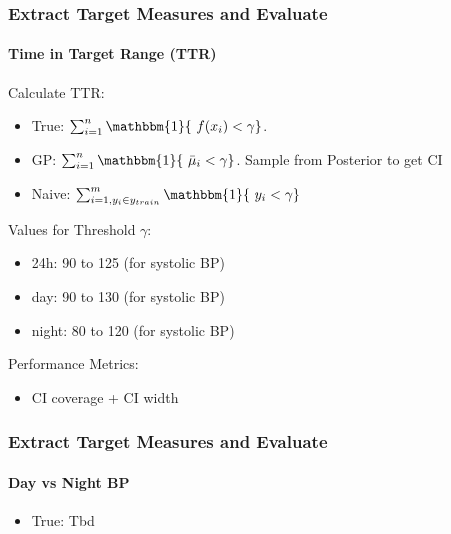 \documentclass[
	8pt, %
]{beamer}
\begin{document}
\begin{frame}
	\frametitle{Extract Target Measures and Evaluate}
	\framesubtitle{Time in Target Range (TTR)} %

	Calculate TTR:
	\begin{itemize}
			\item True: $\sum_{i=1}^{n} \mathbbm{1}\{\ f(x_i) < \gamma \}$.
			\item GP: $\sum_{i=1}^{n} \mathbbm{1}\{\ \bar{\mu}_i < \gamma \}$. Sample from Posterior to get CI
			\item Naive: $\sum_{i=1, y_i \in y_{train}}^{m} \mathbbm{1}\{\ y_i < \gamma \}$
	\end{itemize}


	\bigskip

	Values for Threshold $\gamma$:
	\begin{itemize}
		\item 24h: 90 to 125 (for systolic BP)
		\item day: 90 to 130 (for systolic BP)
		\item night: 80 to 120 (for systolic BP)
	\end{itemize}

	Performance Metrics:
	\begin{itemize}
		\item CI coverage + CI width
	\end{itemize}

\end{frame}



\begin{frame}
	\frametitle{Extract Target Measures and Evaluate}
	\framesubtitle{Day vs Night BP} %
	\begin{itemize}
			\item True: Tbd
	\end{itemize}

\end{frame}
\end{document}
